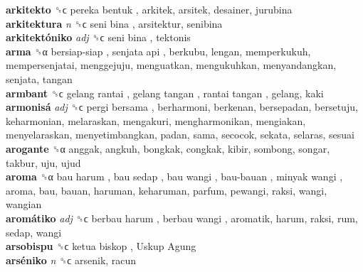 \textbf{arkitekto} ␝ϲ   pereka bentuk , arkitek, arsitek, desainer, jurubina  \\
\textbf{arkitektura} \emph{n}  ␝ϲ   seni bina , arsitektur, senibina  \\
\textbf{arkitektóniko} \emph{adj}  ␝ϲ   seni bina , tektonis  \\
\textbf{arma} ␝α   bersiap-siap ,  senjata api , berkubu, lengan, memperkukuh, mempersenjatai, menggejuju, menguatkan, mengukuhkan, menyandangkan, senjata, tangan  \\
\textbf{armbant} ␝ϲ   gelang rantai ,  gelang tangan ,  rantai tangan , gelang, kaki  \\
\textbf{armonisá} \emph{adj}  ␝ϲ   pergi bersama , berharmoni, berkenan, bersepadan, bersetuju, keharmonian, melaraskan, mengakuri, mengharmonikan, mengiakan, menyelaraskan, menyetimbangkan, padan, sama, secocok, sekata, selaras, sesuai  \\
\textbf{arogante} ␝α  anggak, angkuh, bongkak, congkak, kibir, sombong, songar, takbur, uju, ujud  \\
\textbf{aroma} ␝α   bau harum ,  bau sedap ,  bau wangi ,  bau-bauan ,  minyak wangi , aroma, bau, bauan, haruman, keharuman, parfum, pewangi, raksi, wangi, wangian  \\
\textbf{aromátiko} \emph{adj}  ␝ϲ   berbau harum ,  berbau wangi , aromatik, harum, raksi, rum, sedap, wangi  \\
\textbf{arsobispu} ␝ϲ   ketua biskop ,  Uskup Agung   \\
\textbf{arséniko} \emph{n}  ␝ϲ  arsenik, racun  \\
